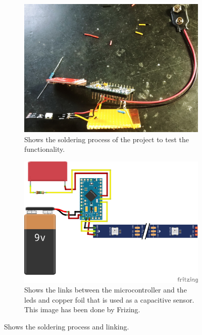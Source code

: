 \documentclass[doc.tex]{subfiles}
\begin{document}
        \begin{figure}[h!]
            \centering
            \begin{subfigure}{.5\textwidth}
            \centering
            \includegraphics[width=.8\linewidth]{images/process/solderingProcess.jpg}
            \caption{Shows the soldering process of the project to test the functionality.}
            \label{fig:test_shapes}
            \end{subfigure}%
            \begin{subfigure}{.5\textwidth}
            \centering
            \includegraphics[width=.8\linewidth]{images/process/sensorLinks.png}
            \caption{Shows the links between the microcontroller and the leds and copper foil that is 
            used as a capacitive sensor. This image has been done by Frizing. \cite{fritzing}}
            \label{fig:ringdesign2}
            \end{subfigure}
            \caption{Shows the soldering process and linking.}
            \label{fig:laserCutTests}
        \end{figure}
\end{document}
